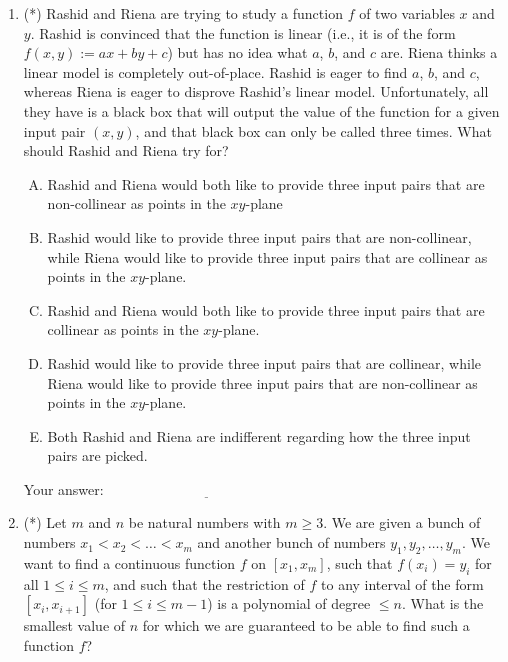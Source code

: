 \documentclass[10pt]{amsart}
\begin{document}
\begin{enumerate}
\item (*) Rashid and Riena are trying to study a function $f$ of two
  variables $x$ and $y$. Rashid is convinced that the function is
  linear (i.e., it is of the form $f(x,y) := ax + by + c$) but has no
  idea what $a$, $b$, and $c$ are. Riena thinks a linear model is
  completely out-of-place. Rashid is eager to find $a$, $b$, and $c$,
  whereas Riena is eager to disprove Rashid's linear
  model. Unfortunately, all they have is a black box that will output
  the value of the function for a given input pair $(x,y)$, and that
  black box can only be called three times. What should Rashid and
  Riena try for?

  \begin{enumerate}[(A)]
  \item Rashid and Riena would both like to provide three input pairs that
    are non-collinear as points in the $xy$-plane
  \item Rashid would like to provide three input pairs that are
    non-collinear, while Riena would like to provide three input pairs
    that are collinear as points in the $xy$-plane.
  \item Rashid and Riena would both like to provide three input pairs
    that are collinear as points in the $xy$-plane.
  \item Rashid would like to provide three input pairs that are
    collinear, while Riena would like to provide three input pairs
    that are non-collinear as points in the $xy$-plane.
  \item Both Rashid and Riena are indifferent regarding how the three
    input pairs are picked.
  \end{enumerate}

  \vspace{0.1in}
  Your answer: $\underline{\qquad\qquad\qquad\qquad\qquad\qquad\qquad}$
  \vspace{0.1in}

\item (*) Let $m$ and $n$ be natural numbers with $m \ge 3$. We are
  given a bunch of numbers $x_1< x_2< \dots<x_m$ and another bunch of
  numbers $y_1,y_2,\dots,y_m$. We want to find a continuous function
  $f$ on $[x_1,x_m]$, such that $f(x_i) = y_i$ for all $1 \le i \le
  m$, and such that the restriction of $f$ to any interval of the form
  $[x_i,x_{i+1}]$ (for $1 \le i \le m - 1$) is a polynomial of degree
  $\le n$. What is the smallest value of $n$ for which we are
  guaranteed to be able to find such a function $f$?


\end{enumerate}
\end{document}
